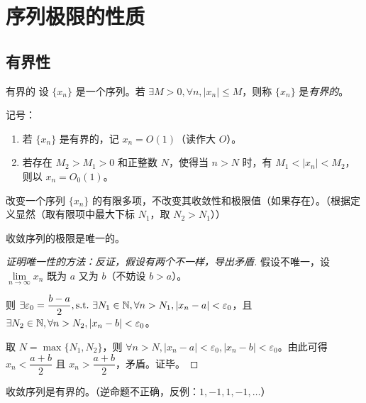 
\section{序列极限的性质}

\subsection{有界性}

\begin{definition}{有界的}
	设 $\{x_n\}$ 是一个序列。若 $\exists M > 0, \forall n, |x_n| \le M$，则称 $\{x_n\}$ 是\emph{有界的}。
\end{definition}

记号：

\begin{enumerate}
	\item 若 $\{x_n\}$ 是有界的，记 $x_n = O(1)$（读作大 $O$）。
	\item 若存在 $M_2 > M_1 > 0$ 和正整数 $N$，使得当 $n > N$ 时，有 $M_1 < |x_n| < M_2$，则以 $x_n = O_0(1)$。
\end{enumerate}

\begin{theorem}
	改变一个序列 $\{x_n\}$ 的有限多项，不改变其收敛性和极限值（如果存在）。（根据定义显然（取有限项中最大下标 $N_1$，取 $N_2 > N_1$））
\end{theorem}

\begin{theorem}[序列极限的唯一性]
	收敛序列的极限是唯一的。
\end{theorem}

\begin{proof}[证明唯一性的方法：反证，假设有两个不一样，导出矛盾]
	假设不唯一，设 $\lim\limits_{n \rightarrow \infty} x_n$ 既为 $a$ 又为 $b$（不妨设 $b > a$）。

	则 $\exists \varepsilon_0 = \dfrac{b - a}{2}, \text{s.t.~} \exists N_1 \in \mathbb N, \forall n > N_1, |x_n - a| < \varepsilon_0$，且 $\exists N_2 \in \mathbb N, \forall n > N_2, |x_n - b| < \varepsilon_0$。

	取 $N = \max\{N_1, N_2\}$，则 $\forall n > N, |x_n - a| < \varepsilon_0, |x_n - b| < \varepsilon_0$。由此可得 $x_n < \dfrac{a + b}{2}$ 且 $x_n > \dfrac{a + b}{2}$，矛盾。证毕。
\end{proof}

\begin{theorem}[序列极限的有界性]
	收敛序列是有界的。（逆命题不正确，反例：$1, -1, 1, -1, \ldots$）
\end{theorem}

